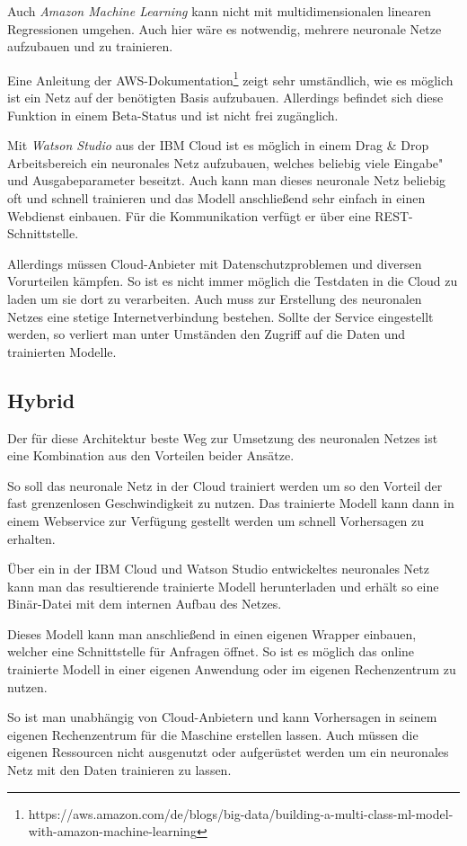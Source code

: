 Auch \textit{Amazon Machine Learning} kann nicht mit multidimensionalen linearen Regressionen umgehen. Auch hier wäre es
notwendig, mehrere neuronale Netze aufzubauen und zu trainieren.

Eine Anleitung der
AWS-Dokumentation\footnote{https://aws.amazon.com/de/blogs/big-data/building-a-multi-class-ml-model-with-amazon-machine-learning}
zeigt sehr umständlich, wie es möglich ist ein Netz auf der benötigten Basis aufzubauen. Allerdings befindet sich diese
Funktion in einem Beta-Status und ist nicht frei zugänglich.

Mit \textit{Watson Studio} aus der IBM Cloud ist es möglich in einem Drag \& Drop Arbeitsbereich ein neuronales Netz
aufzubauen, welches beliebig viele Eingabe"~ und Ausgabeparameter beseitzt. Auch kann man dieses neuronale Netz beliebig
oft und schnell trainieren und das Modell anschließend sehr einfach in einen Webdienst einbauen. Für die Kommunikation
verfügt er über eine REST-Schnittstelle.

Allerdings müssen Cloud-Anbieter mit Datenschutzproblemen und diversen Vorurteilen kämpfen. So ist es nicht immer
möglich die Testdaten in die Cloud zu laden um sie dort zu verarbeiten. Auch muss zur Erstellung des neuronalen Netzes
eine stetige Internetverbindung bestehen. Sollte der Service eingestellt werden, so verliert man unter Umständen den
Zugriff auf die Daten und trainierten Modelle.

\subsection{Hybrid}
Der für diese Architektur beste Weg zur Umsetzung des neuronalen Netzes ist eine Kombination aus den Vorteilen beider
Ansätze.

So soll das neuronale Netz in der Cloud trainiert werden um so den Vorteil der fast grenzenlosen Geschwindigkeit zu
nutzen. Das trainierte Modell kann dann in einem Webservice zur Verfügung gestellt werden um schnell Vorhersagen zu
erhalten.

Über ein in der IBM Cloud und Watson Studio entwickeltes neuronales Netz kann man das resultierende trainierte Modell
herunterladen und erhält so eine Binär-Datei mit dem internen Aufbau des Netzes.

Dieses Modell kann man anschließend in einen eigenen Wrapper einbauen, welcher eine Schnittstelle für Anfragen öffnet.
So ist es möglich das online trainierte Modell in einer eigenen Anwendung oder im eigenen Rechenzentrum zu nutzen.

So ist man unabhängig von Cloud-Anbietern und kann Vorhersagen in seinem eigenen Rechenzentrum für die Maschine
erstellen lassen. Auch müssen die eigenen Ressourcen nicht ausgenutzt oder aufgerüstet werden um ein neuronales Netz mit
den Daten trainieren zu lassen.